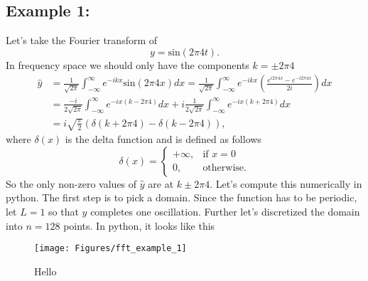 \documentclass{article}
\begin{document}
\subsection{Example 1:}
Let's take the Fourier transform of 
\begin{equation*}
y = \mathrm{sin}(2\pi 4t).
\end{equation*}
In frequency space we should only have the components $k=\pm2\pi 4$ 
\begin{align*}
\widehat{y} &= \frac{1}{\sqrt{2\pi}}\int_{-\infty}^{\infty} e^{-ikx} \mathrm{sin}(2\pi 4x)dx =\frac{1}{\sqrt{2\pi}}\int_{-\infty}^{\infty} e^{-ikx} \left(\frac{e^{i2\pi 4x}-e^{-i2\pi 4x}}{2i}\right)dx\\
&=\frac{-i}{2\sqrt{2\pi}}\int_{-\infty}^{\infty} e^{-ix(k-2\pi 4)}dx + i\frac{1}{2\sqrt{2\pi}}\int_{-\infty}^{\infty} e^{-ix(k +2\pi 4)}dx\\
&=i\sqrt{\frac{\pi}{2}}\left(\delta(k+2\pi 4) - \delta(k-2\pi 4)\right),
\end{align*}
where $\delta(x)$ is the delta function and is defined as follows
\[
    \delta(x)= 
\begin{cases}
    +\infty, & \text{if } x=0\\
    0,              & \text{otherwise.}
\end{cases}
\]
So the only non-zero values of $\widehat{y}$ are at $k\pm 2\pi 4$. Let's compute this numerically in python. The first step is to pick a domain. Since the function has to be periodic, let $L=1$ so that $y$ completes one oscillation. Further let's discretized the domain into $n=128$ points. In python, it looks like this

\begin{figure}[h!]
\begin{center}
\texttt{[image: Figures/fft\_example\_1]}
\end{center}
\caption{Hello}
\label{fig: fft example 1}
\end{figure}
\end{document}
